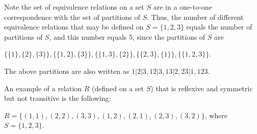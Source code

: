 \begin{xca}
Note the set of equivalence relations on a set $S$ are in a one-to-one
correspondence with the set of partitions of $S$. Thus, the number of different
equivalence relations that may be defined on $S = \{ 1, 2, 3\}$ equals the
number of partitions of $S$, and this number equals $5$, since the partitions
of $S$ are
\begin{center}
    $\{ \{ 1 \}, \{ 2 \}, \{ 3 \} \}, \{ \{ 1, 2 \}, \{ 3 \} \}, \{ \{ 1, 3 \},
    \{ 2 \} \}, \{ \{ 2, 3 \}, \{ 1 \} \}, \{ \{ 1, 2, 3 \} \}$.
\end{center}
The above partitions are also written as $1|2|3, 12|3, 13|2, 23|1, 123$.
\end{xca}

\begin{xca}
An example of a relation $R$ (defined on a set $S$) that is reflexive and
symmetric but not transitive is the following:
\begin{center}
$R = \{ (1,1), (2,2), (3,3), (1,2), (2,1), (2,3), (3,2) \}$, where
$S = \{ 1,2,3 \}$.
\end{center}
\end{xca}

